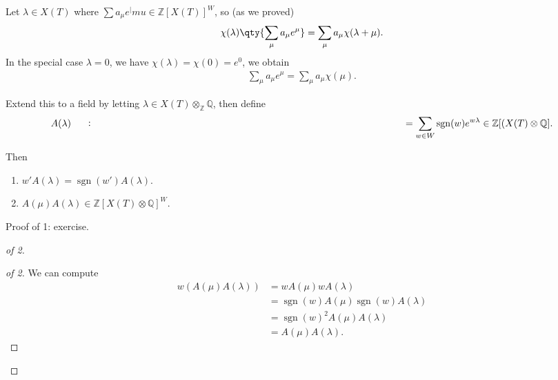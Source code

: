 \begin{lemma}[?]

\begin{lemma}[?]

Let \(\lambda \in X(T)\) where
\(\sum a_\mu e^|mu \in {\mathbb{Z}}[X(T)]^W\), so (as we proved)
\begin{align*}   \chi(\lambda) \qty{ \sum_\mu a_\mu e^\mu } = \sum_\mu a_\mu \chi(\lambda + \mu) .\end{align*}
In the special case \(\lambda = 0\), we have
\(\chi(\lambda) = \chi(0) = e^0\), we obtain
\begin{align*}   \sum_\mu a_\mu e^\mu = \sum_\mu a_\mu \chi(\mu) .\end{align*}

Extend this to a field by letting
\(\lambda \in X(T) \otimes_{\mathbb{Z}}{\mathbb{Q}}\), then define
\begin{align*}   A(\lambda) \mathrel{\vcenter{:}}=\sum_{w\in W} \operatorname{sgn}(w) e^{w \lambda} \in {\mathbb{Z}}[ (X(T) \otimes{\mathbb{Q}}] .\end{align*}

Then

\begin{enumerate}
\def\labelenumi{\arabic{enumi}.}
\item
  \(w' A(\lambda) = \operatorname{sgn}(w') A(\lambda)\).
\item
  \(A(\mu) A(\lambda) \in {\mathbb{Z}}[X(T) \otimes{\mathbb{Q}}]^W\).
\end{enumerate}

\end{lemma}

\end{lemma}

Proof of 1: exercise.

\begin{proof}[of 2]

\begin{proof}[of 2]

We can compute
\begin{align*}   w(A(\mu) A(\lambda) )  &= w A(\mu)  w A(\lambda) \\ &= \operatorname{sgn}(w) A(\mu)  \operatorname{sgn}(w) A(\lambda) \\ &= \operatorname{sgn}(w)^2 A(\mu) A(\lambda) \\ &= A(\mu) A(\lambda) .\end{align*}

\end{proof}

\end{proof}

